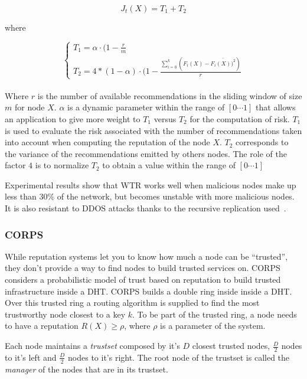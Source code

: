 \begin{equation}
  J_t(X) =  T_1 + T_2
\end{equation}

where

\begin{equation}
  \left\{
  \begin{array}{l}
    T_1 = \alpha \cdot (1-\frac{r}{m}\\
    T_2 = 4 * (1- \alpha) \cdot (1-\frac{\sum_{i=0}^{k} (F_i(X)-\bar{F_i(X))^2})}{r}
  \end{array}\right.
\end{equation}\\

Where $r$ is the number of available recommendations in the sliding window of
size $m$ for node $X$. $\alpha$ is a dynamic parameter within the range of
$[0\cdots 1]$ that allows an application to give more weight to $T_1$ versus
$T_2$ for the computation of risk. $T_1$ is used to evaluate the risk
associated with the number of recommendations taken into account when computing the
reputation of the node $X$. $T_2$ corresponds to the variance of the
recommendations emitted by others nodes. The role of the factor $4$ is to
normalize $T_2$ to obtain a value within the range of $[0\cdots 1]$

Experimental results show that WTR works well when malicious nodes make up less
than $30\%$ of the network, but becomes unstable with more malicious nodes.
It is also resistant to DDOS attacks
thanks to the recursive replication used~\cite{recursive_replication}.

\subsubsection{CORPS}
\label{sec:corps}
While reputation systems let you to know how much a node can be
``trusted'', they don't provide a way to find nodes to build trusted services
on. CORPS~\cite{rosas2011corps} considers a probabilistic model of trust based on
reputation to build trusted infrastructure inside a DHT. CORPS builds a double
ring inside inside a DHT. Over this trusted ring a routing algorithm is supplied to
find the most trustworthy node closest to a key $k$.
To be part of the trusted ring, a node needs to have a reputation $R(X) \ge
\rho$, where $\rho$ is a parameter of the system. 

Each node maintains a \textit{trustset} composed by it's $D$ closest trusted
nodes, $\frac{D}{2}$ nodes to it's left and $\frac{D}{2}$ nodes to it's right.
The root node of the trustset is called the \textit{manager} of the nodes that are
in its trustset.

